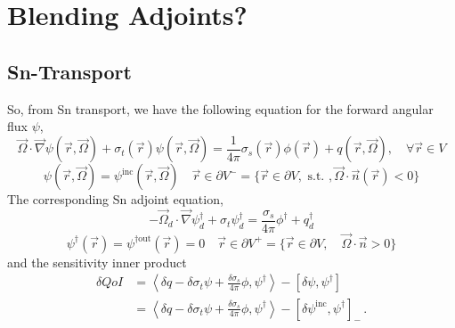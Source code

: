 \documentclass{article}
\newcommand{\vr}{\vec{r}}
\newcommand{\vO}{\vec{\Omega}}
\newcommand{\bra}{\left\langle}
\newcommand{\ket}{\right\rangle}
\newcommand{\sbra}{\left[}
\newcommand{\sket}{\right]}
\newcommand{\grad}{\vec{\nabla}}
\newcommand{\bound}{\partial V}
\newcommand{\sigt}{\sigma_t}
\newcommand{\sigs}{\sigma_s}
\newcommand{\scalSource}{q}
\newcommand{\angResp}{q^\dag}
\begin{document}
\section{Blending Adjoints?}
\subsection{Sn-Transport}
So, from Sn transport, we have the following equation for the forward angular flux $\psi$,
\begin{equation}
\label{SS1GTE}
\vO \cdot \grad \psi(\vr,\vO) + \sigt(\vr) \psi(\vr,\vO) = \frac{1}{4 \pi} \sigs(\vr) \phi(\vr) + q(\vr,\vO), \quad \forall \vr \in V
\end{equation}
\begin{equation}
\label{SS1GTE_bc}
\psi(\vr,\vO) = \psi^{\text{inc}}(\vr,\vO) \quad \vr \in \partial V^{-} = \{ \vr \in \partial V, \text{ s.t. }, \vO \cdot \vec{n}(\vr) < 0\}
\end{equation}
The corresponding Sn adjoint equation,
\begin{equation}
\label{snAdj}
- \vO_d \cdot \grad \psi^\dag_d + \sigt \psi^\dag_d = \frac{\sigs}{4 \pi} \phi^\dag + \angResp_d
\end{equation}
\begin{equation}
\psi^\dag(\vr) = \psi^{\dag \text{out}}(\vr)=0 \quad \vr \in \partial V^{+} = \{  \vr \in \bound , \quad \vO \cdot \vec{n} > 0 \}
\end{equation}
and the sensitivity inner product
\begin{equation}
\label{snSens}
\begin{split}
\delta QoI &= \bra \delta \scalSource - \delta \sigt \psi + \frac{\delta\sigs}{4 \pi} \phi  , \psi^\dag  \ket - \sbra \delta \psi, \psi^\dag \sket \\
&= \bra \delta \scalSource - \delta \sigt \psi + \frac{\delta\sigs}{4 \pi} \phi , \psi^\dag  \ket - \sbra \delta \psi^{\text{inc}}, \psi^\dag \sket_- \,.
\end{split}
\end{equation}
\end{document}
